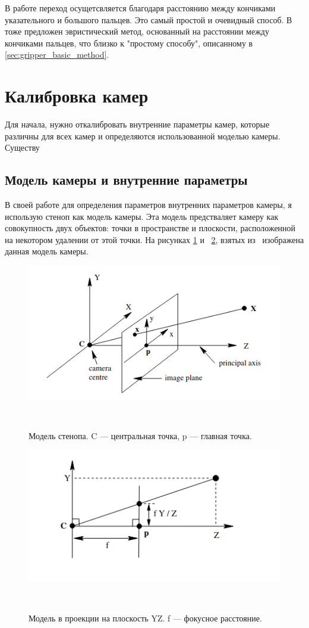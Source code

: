 \documentclass[12pt, a4paper]{article}
\begin{document}
В работе \cite{literally-me} переход осущетсвляется благодаря расстоянию между
кончиками указательного и большого пальцев. Это самый простой и очевидный
способ. В~\cite{gesture_control} тоже предложен эвристический метод, основанный
на расстоянии между кончиками пальцев, что близко к "простому способу",
описанному в \ref{sec:gripper_basic_method}.

\section{Калибровка камер}
Для начала, нужно откалибровать внутренние параметры камер, которые различны
для всех камер и определяются использованной моделью камеры. Существу

\subsection{Модель камеры и внутренние параметры}
\label{sec:camera_model} 
В своей работе для определения параметров внутренних
параметров камеры, я использую стеноп как модель камеры. Эта модель
предстваляет камеру как совокупность двух объектов: точки в пространстве и
плоскости, расположенной на некотором удалении от этой точки. На рисунках
\ref{fig:pinhole_model} и
~\ref{fig:pinhole_geometry}, взятых из~\cite{multiview_cv} изображена данная
модель камеры.

\begin{figure}[h!]
    \includegraphics[scale=1]{images/camera_model/pinhole_visualisation.png}
    \caption{Модель стенопа. C --- центральная точка, p --- главная точка.}
~\label{fig:pinhole_model}
\end{figure}

\begin{figure}[h!]
        \includegraphics[scale=1]{images/camera_model/pinhole_visualisation_side.png}
        \caption{Модель в проекции на плоскость YZ. f --- фокусное расстояние.}
~\label{fig:pinhole_geometry}
\end{figure}
\end{document}
